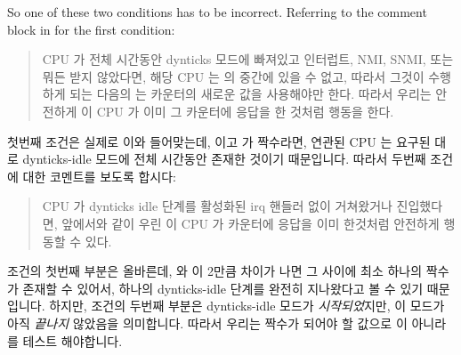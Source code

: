 So one of these two conditions has to be incorrect.
Referring to the comment block in 
for the first condition:
\fi

\begin{quote}
	CPU 가 전체 시간동안 dynticks 모드에 빠져있고 인터럽트, NMI, SNMI, 또는
	뭐든 받지 않았다면, 해당 CPU 는  의 중간에 있을 수
	없고, 따라서 그것이 수행하게 되는 다음의  는
	카운터의 새로운 값을 사용해야만 한다.  따라서 우리는 안전하게 이 CPU 가
	이미 그 카운터에 응답을 한 것처럼 행동을 한다.
	\iffalse

	If the CPU remained in dynticks mode for the entire time
	and didn't take any interrupts, NMIs, SMIs, or whatever,
	then it cannot be in the middle of an \co{rcu_read_lock()}, so
	the next \co{rcu_read_lock()} it executes must use the new value
	of the counter.  So we can safely pretend that this CPU
	already acknowledged the counter.
	\fi
\end{quote}

첫번째 조건은 실제로 이와 들어맞는데,  이고  가
짝수라면, 연관된 CPU 는 요구된 대로 dynticks-idle 모드에 전체 시간동안 존재한
것이기 때문입니다.
따라서 두번째 조건에 대한 코멘트를 보도록 합시다:
\iffalse

The first condition does match this, because if \co{curr == snap}
and if \co{curr} is even, then the corresponding CPU has been
in dynticks-idle mode the entire time, as required.
So let's look at the comment block for the second condition:
\fi

\begin{quote}
	CPU 가 dynticks idle 단계를 활성화된 irq 핸들러 없이 거쳐왔거나
	진입했다면, 앞에서와 같이 우린 이 CPU 가 카운터에 응답을 이미 한것처럼
	안전하게 행동할 수 있다.
	\iffalse

	If the CPU passed through or entered a dynticks idle phase with
	no active irq handlers, then, as above, we can safely pretend
	that this CPU already acknowledged the counter.
	\fi
\end{quote}

조건의 첫번째 부분은 올바른데,  와  이 2만큼 차이가 나면 그
사이에 최소 하나의 짝수가 존재할 수 있어서, 하나의 dynticks-idle 단계를 완전히
지나왔다고 볼 수 있기 때문입니다.
하지만, 조건의 두번째 부분은 dynticks-idle 모드가 \emph{시작되었}지만, 이
모드가 아직 \emph{끝나지} 않았음을 의미합니다.
따라서 우리는 짝수가 되어야 할 값으로  이 아니라  를 테스트
해야합니다.

